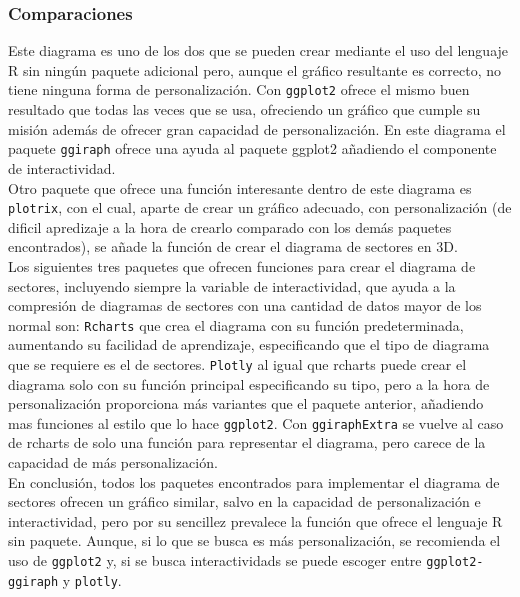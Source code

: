 \documentclass{article}\usepackage[]{graphicx}\usepackage[]{color}
\begin{document}
\subsubsection{Comparaciones}
Este diagrama es uno de los dos que se pueden crear mediante el uso del lenguaje R sin ning\'un paquete adicional pero, aunque el gr\'afico resultante es correcto, no tiene ninguna forma de personalizaci\'on. Con \texttt{ggplot2} ofrece el mismo buen resultado que todas las veces que se usa, ofreciendo un gr\'afico que cumple su misi\'on adem\'as de ofrecer gran capacidad de personalizaci\'on. En este diagrama el paquete \texttt{ggiraph} ofrece una ayuda al paquete ggplot2 a\~nadiendo el componente de interactividad.~\\ Otro paquete que ofrece una funci\'on interesante dentro de este diagrama es \texttt{plotrix}, con el cual, aparte de crear un gr\'afico adecuado, con personalizaci\'on (de dificil apredizaje a la hora de crearlo comparado con los dem\'as paquetes encontrados), se a\~nade la funci\'on de crear el diagrama de sectores en 3D.~\\
Los siguientes tres paquetes que ofrecen funciones para crear el diagrama de sectores, incluyendo siempre la variable de interactividad, que ayuda a la compresi\'on de diagramas de sectores con una cantidad de datos mayor de los normal son: \texttt{Rcharts} que crea el diagrama con su funci\'on predeterminada, aumentando su facilidad de aprendizaje, especificando que el tipo de diagrama que se requiere es el de sectores. \texttt{Plotly} al igual que rcharts puede crear el diagrama solo con su funci\'on principal especificando su tipo, pero a la hora de personalizaci\'on proporciona m\'as variantes que el paquete anterior, a\~nadiendo mas funciones al estilo que lo hace \texttt{ggplot2}. Con \texttt{ggiraphExtra} se vuelve al caso de rcharts de solo una funci\'on para representar el diagrama, pero carece de la capacidad de m\'as personalizaci\'on.~\\
En conclusi\'on, todos los paquetes encontrados para implementar el diagrama de sectores ofrecen un gr\'afico similar, salvo en la capacidad de personalizaci\'on e interactividad, pero por su sencillez prevalece la funci\'on que ofrece el lenguaje R sin paquete. Aunque, si lo que se busca es m\'as personalizaci\'on, se recomienda el uso de \texttt{ggplot2} y, si se busca interactividads se puede escoger entre \texttt{ggplot2-ggiraph} y \texttt{plotly}.
\clearpage
\end{document}

